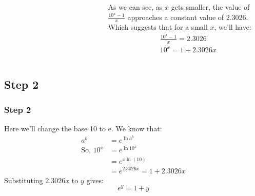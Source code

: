 \documentclass{beamer}
\begin{document}
\begin{frame}
\begin{columns}
\begin{table}[]
\begin{tabular}{|l|l|l|}
        \end{tabular}
    \end{table}
    \pause
    As we can see, as $x$ gets smaller, the value of $\frac{10^x-1}{x}$ approaches a constant value of 2.3026. Which suggests that for a small $x$, we'll have:
    \begin{equation}
        \begin{split}
            &\frac{10^x-1}{x} = 2.3026 \\
            &10^x = 1 + 2.3026x
        \end{split}
    \end{equation}
    \end{columns}
\end{frame}

\subsection{Step 2}
\begin{frame}
    \frametitle{Step 2}
    Here we'll change the base 10 to e. We know that:
    \begin{equation}
        \begin{split}
            a^b &= e^{\ln{a^b}}\\
            \text{So, } 10^x &= e^{\ln{10^x}}\\
            &=e^{x\ln(10)}\\
            &= e^{2.3026x} = 1+2.3026x
        \end{split}
    \end{equation}
Substituting $2.3026x$ to $y$ gives:
\begin{equation}
    \label{eq:5}
    e^y = 1 +y
\end{equation}
\end{frame}
\end{document}

